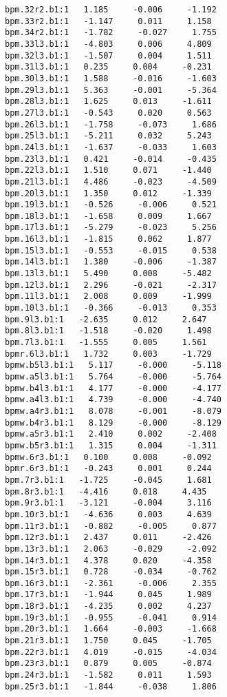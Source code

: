 \begin{verbatim}
bpm.32r2.b1:1   1.185     -0.006     -1.192
bpm.33r2.b1:1   -1.147     0.011     1.158
bpm.34r2.b1:1   -1.782     -0.027     1.755
bpm.33l3.b1:1   -4.803     0.006     4.809
bpm.32l3.b1:1   -1.507     0.004     1.511
bpm.31l3.b1:1   0.235     0.004     -0.231
bpm.30l3.b1:1   1.588     -0.016     -1.603
bpm.29l3.b1:1   5.363     -0.001     -5.364
bpm.28l3.b1:1   1.625     0.013     -1.611
bpm.27l3.b1:1   -0.543     0.020     0.563
bpm.26l3.b1:1   -1.758     -0.073     1.686
bpm.25l3.b1:1   -5.211     0.032     5.243
bpm.24l3.b1:1   -1.637     -0.033     1.603
bpm.23l3.b1:1   0.421     -0.014     -0.435
bpm.22l3.b1:1   1.510     0.071     -1.440
bpm.21l3.b1:1   4.486     -0.023     -4.509
bpm.20l3.b1:1   1.350     0.012     -1.339
bpm.19l3.b1:1   -0.526     -0.006     0.521
bpm.18l3.b1:1   -1.658     0.009     1.667
bpm.17l3.b1:1   -5.279     -0.023     5.256
bpm.16l3.b1:1   -1.815     0.062     1.877
bpm.15l3.b1:1   -0.553     -0.015     0.538
bpm.14l3.b1:1   1.380     -0.006     -1.387
bpm.13l3.b1:1   5.490     0.008     -5.482
bpm.12l3.b1:1   2.296     -0.021     -2.317
bpm.11l3.b1:1   2.008     0.009     -1.999
bpm.10l3.b1:1   -0.366     -0.013     0.353
bpm.9l3.b1:1   -2.635     0.012     2.647
bpm.8l3.b1:1   -1.518     -0.020     1.498
bpm.7l3.b1:1   -1.555     0.005     1.561
bpmr.6l3.b1:1   1.732     0.003     -1.729
bpmw.b5l3.b1:1   5.117     -0.000     -5.118
bpmw.a5l3.b1:1   5.764     -0.000     -5.764
bpmw.b4l3.b1:1   4.177     -0.000     -4.177
bpmw.a4l3.b1:1   4.739     -0.000     -4.740
bpmw.a4r3.b1:1   8.078     -0.001     -8.079
bpmw.b4r3.b1:1   8.129     -0.000     -8.129
bpmw.a5r3.b1:1   2.410     0.002     -2.408
bpmw.b5r3.b1:1   1.315     0.004     -1.311
bpmw.6r3.b1:1   0.100     0.008     -0.092
bpmr.6r3.b1:1   -0.243     0.001     0.244
bpm.7r3.b1:1   -1.725     -0.045     1.681
bpm.8r3.b1:1   -4.416     0.018     4.435
bpm.9r3.b1:1   -3.121     -0.004     3.116
bpm.10r3.b1:1   -4.636     0.003     4.639
bpm.11r3.b1:1   -0.882     -0.005     0.877
bpm.12r3.b1:1   2.437     0.011     -2.426
bpm.13r3.b1:1   2.063     -0.029     -2.092
bpm.14r3.b1:1   4.378     0.020     -4.358
bpm.15r3.b1:1   0.728     -0.034     -0.762
bpm.16r3.b1:1   -2.361     -0.006     2.355
bpm.17r3.b1:1   -1.944     0.045     1.989
bpm.18r3.b1:1   -4.235     0.002     4.237
bpm.19r3.b1:1   -0.955     -0.041     0.914
bpm.20r3.b1:1   1.664     -0.003     -1.668
bpm.21r3.b1:1   1.750     0.045     -1.705
bpm.22r3.b1:1   4.019     -0.015     -4.034
bpm.23r3.b1:1   0.879     0.005     -0.874
bpm.24r3.b1:1   -1.582     0.011     1.593
bpm.25r3.b1:1   -1.844     -0.038     1.806

\end{verbatim}
